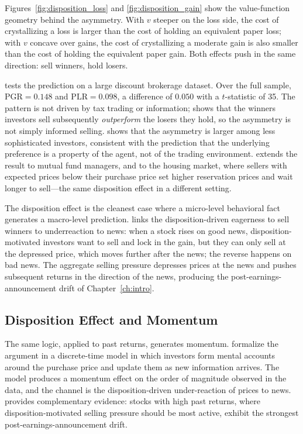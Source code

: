 Figures~\ref{fig:disposition_loss} and \ref{fig:disposition_gain} show the value-function geometry behind the asymmetry. With $v$ steeper on the loss side, the cost of crystallizing a loss is larger than the cost of holding an equivalent paper loss; with $v$ concave over gains, the cost of crystallizing a moderate gain is also smaller than the cost of holding the equivalent paper gain. Both effects push in the same direction: sell winners, hold losers.

\citet{odean1998} tests the prediction on a large discount brokerage dataset. Over the full sample, $\mathrm{PGR} = 0.148$ and $\mathrm{PLR} = 0.098$, a difference of $0.050$ with a $t$-statistic of 35. The pattern is not driven by tax trading or information; \citet{odean1998} shows that the winners investors sell subsequently \emph{outperform} the losers they hold, so the asymmetry is not simply informed selling. \citet{dhar2006} shows that the asymmetry is larger among less sophisticated investors, consistent with the prediction that the underlying preference is a property of the agent, not of the trading environment. \citet{frazzini2006} extends the result to mutual fund managers, and \citet{genesove2001} to the housing market, where sellers with expected prices below their purchase price set higher reservation prices and wait longer to sell---the same disposition effect in a different setting.

The disposition effect is the cleanest case where a micro-level behavioral fact generates a macro-level prediction. \citet{frazzini2006} links the disposition-driven eagerness to sell winners to underreaction to news: when a stock rises on good news, disposition-motivated investors want to sell and lock in the gain, but they can only sell at the depressed price, which moves further after the news; the reverse happens on bad news. The aggregate selling pressure depresses prices at the news and pushes subsequent returns in the direction of the news, producing the post-earnings-announcement drift of Chapter~\ref{ch:intro}.

\subsection{Disposition Effect and Momentum}

The same logic, applied to past returns, generates momentum. \citet{grinblatt2005} formalize the argument in a discrete-time model in which investors form mental accounts around the purchase price and update them as new information arrives. The model produces a momentum effect on the order of magnitude observed in the data, and the channel is the disposition-driven under-reaction of prices to news. \citet{frazzini2006} provides complementary evidence: stocks with high past returns, where disposition-motivated selling pressure should be most active, exhibit the strongest post-earnings-announcement drift.

